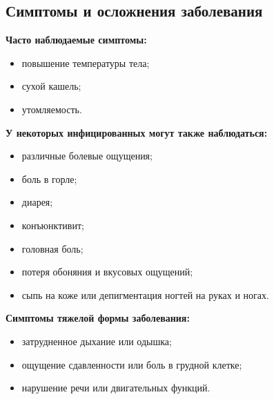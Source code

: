 \documentclass[a4paper, 12pt]{extarticle}
\begin{document}
\subsection{Симптомы и осложнения заболевания}
\vspace{3mm}

\textbf{Часто наблюдаемые симптомы:}
\begin{itemize}
    \item повышение температуры тела;
    \item сухой кашель;
    \item утомляемость.
\end{itemize}

\vspace{5mm}

\textbf{У некоторых инфицированных могут также наблюдаться:}
\begin{itemize}
    \item различные болевые ощущения;
    \item боль в горле;
    \item диарея;
    \item конъюнктивит;
    \item головная боль;
    \item потеря обоняния и вкусовых ощущений;
    \item сыпь на коже или депигментация ногтей на руках и ногах.
\end{itemize}

\vspace{5mm}

\textbf{Симптомы тяжелой формы заболевания:}
\begin{itemize}
    \item затрудненное дыхание или одышка;
    \item ощущение сдавленности или боль в грудной клетке;
    \item нарушение речи или двигательных функций.
\end{itemize}

\vspace{5mm}
\end{document}
